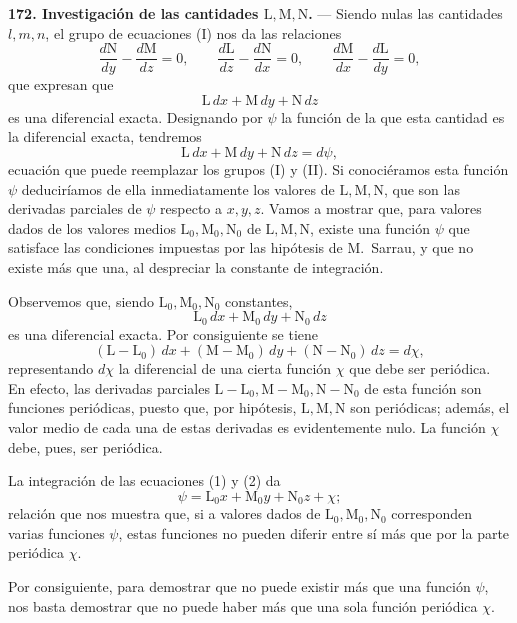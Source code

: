 \noindent\textbf{172. Investigación de las cantidades $\mathrm L,\mathrm
M,\mathrm N$.} — Siendo nulas las cantidades $l,m,n$, el grupo de
ecuaciones (I) nos da las relaciones
\[
\frac{d\mathrm N}{dy}-\frac{d\mathrm M}{dz}=0,\qquad
\frac{d\mathrm L}{dz}-\frac{d\mathrm N}{dx}=0,\qquad
\frac{d\mathrm M}{dx}-\frac{d\mathrm L}{dy}=0,
\]
que expresan que
\[
\mathrm L\,dx+\mathrm M\,dy+\mathrm N\,dz
\]
es una diferencial exacta. Designando por $\psi$ la función de la que
esta cantidad es la diferencial exacta, tendremos
\begin{equation}
\mathrm L\,dx+\mathrm M\,dy+\mathrm N\,dz=d\psi,
\tag{1}
\end{equation}
ecuación que puede reemplazar los grupos (I) y (II). Si conociéramos esta
función $\psi$ deduciríamos de ella inmediatamente los valores de
$\mathrm L,\mathrm M,\mathrm N$, que son las derivadas parciales de $\psi$
respecto a $x,y,z$. Vamos a mostrar que, para valores dados de los valores
medios $\mathrm L_0,\mathrm M_0,\mathrm N_0$ de $\mathrm L,\mathrm
M,\mathrm N$, existe una función $\psi$ que satisface las condiciones
impuestas por las hipótesis de M.~Sarrau, y que no existe más que una, al
despreciar la constante de integración.

Observemos que, siendo $\mathrm L_0,\mathrm M_0,\mathrm N_0$ constantes,
\[
\mathrm L_0\,dx+\mathrm M_0\,dy+\mathrm N_0\,dz
\]
es una diferencial exacta. Por consiguiente se tiene
\begin{equation}
(\mathrm L-\mathrm L_0)\,dx+(\mathrm M-\mathrm M_0)\,dy+(\mathrm N-\mathrm N_0)\,dz=d\chi,
\tag{2}
\end{equation}
representando $d\chi$ la diferencial de una cierta función $\chi$ que
debe ser periódica. En efecto, las derivadas parciales $\mathrm
L-\mathrm L_0,\mathrm M-\mathrm M_0,\mathrm N-\mathrm N_0$ de esta función
son funciones periódicas, puesto que, por hipótesis, $\mathrm L,\mathrm
M,\mathrm N$ son periódicas; además, el valor medio de cada una de estas
derivadas es evidentemente nulo. La función $\chi$ debe, pues, ser
periódica.

La integración de las ecuaciones (1) y (2) da
\[
\psi=\mathrm L_0x+\mathrm M_0y+\mathrm N_0z+\chi;
\]
relación que nos muestra que, si a valores dados de $\mathrm L_0,\mathrm
M_0,\mathrm N_0$ corresponden varias funciones $\psi$, estas funciones no
pueden diferir entre sí más que por la parte periódica $\chi$.

Por consiguiente, para demostrar que no puede
existir más que una función $\psi$, nos basta demostrar que no puede
haber más que una sola función periódica $\chi$.

